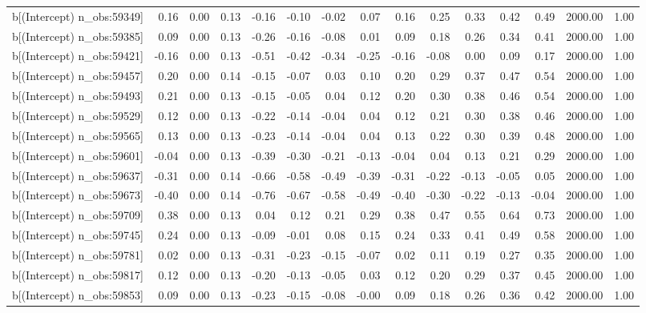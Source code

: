 \begin{table}[ht]
\begin{tabular}{rrrrrrrrrrrrrrr}
  b[(Intercept) n\_obs:59349] & 0.16 & 0.00 & 0.13 & -0.16 & -0.10 & -0.02 & 0.07 & 0.16 & 0.25 & 0.33 & 0.42 & 0.49 & 2000.00 & 1.00 \\ 
  b[(Intercept) n\_obs:59385] & 0.09 & 0.00 & 0.13 & -0.26 & -0.16 & -0.08 & 0.01 & 0.09 & 0.18 & 0.26 & 0.34 & 0.41 & 2000.00 & 1.00 \\ 
  b[(Intercept) n\_obs:59421] & -0.16 & 0.00 & 0.13 & -0.51 & -0.42 & -0.34 & -0.25 & -0.16 & -0.08 & 0.00 & 0.09 & 0.17 & 2000.00 & 1.00 \\ 
  b[(Intercept) n\_obs:59457] & 0.20 & 0.00 & 0.14 & -0.15 & -0.07 & 0.03 & 0.10 & 0.20 & 0.29 & 0.37 & 0.47 & 0.54 & 2000.00 & 1.00 \\ 
  b[(Intercept) n\_obs:59493] & 0.21 & 0.00 & 0.13 & -0.15 & -0.05 & 0.04 & 0.12 & 0.20 & 0.30 & 0.38 & 0.46 & 0.54 & 2000.00 & 1.00 \\ 
  b[(Intercept) n\_obs:59529] & 0.12 & 0.00 & 0.13 & -0.22 & -0.14 & -0.04 & 0.04 & 0.12 & 0.21 & 0.30 & 0.38 & 0.46 & 2000.00 & 1.00 \\ 
  b[(Intercept) n\_obs:59565] & 0.13 & 0.00 & 0.13 & -0.23 & -0.14 & -0.04 & 0.04 & 0.13 & 0.22 & 0.30 & 0.39 & 0.48 & 2000.00 & 1.00 \\ 
  b[(Intercept) n\_obs:59601] & -0.04 & 0.00 & 0.13 & -0.39 & -0.30 & -0.21 & -0.13 & -0.04 & 0.04 & 0.13 & 0.21 & 0.29 & 2000.00 & 1.00 \\ 
  b[(Intercept) n\_obs:59637] & -0.31 & 0.00 & 0.14 & -0.66 & -0.58 & -0.49 & -0.39 & -0.31 & -0.22 & -0.13 & -0.05 & 0.05 & 2000.00 & 1.00 \\ 
  b[(Intercept) n\_obs:59673] & -0.40 & 0.00 & 0.14 & -0.76 & -0.67 & -0.58 & -0.49 & -0.40 & -0.30 & -0.22 & -0.13 & -0.04 & 2000.00 & 1.00 \\ 
  b[(Intercept) n\_obs:59709] & 0.38 & 0.00 & 0.13 & 0.04 & 0.12 & 0.21 & 0.29 & 0.38 & 0.47 & 0.55 & 0.64 & 0.73 & 2000.00 & 1.00 \\ 
  b[(Intercept) n\_obs:59745] & 0.24 & 0.00 & 0.13 & -0.09 & -0.01 & 0.08 & 0.15 & 0.24 & 0.33 & 0.41 & 0.49 & 0.58 & 2000.00 & 1.00 \\ 
  b[(Intercept) n\_obs:59781] & 0.02 & 0.00 & 0.13 & -0.31 & -0.23 & -0.15 & -0.07 & 0.02 & 0.11 & 0.19 & 0.27 & 0.35 & 2000.00 & 1.00 \\ 
  b[(Intercept) n\_obs:59817] & 0.12 & 0.00 & 0.13 & -0.20 & -0.13 & -0.05 & 0.03 & 0.12 & 0.20 & 0.29 & 0.37 & 0.45 & 2000.00 & 1.00 \\ 
  b[(Intercept) n\_obs:59853] & 0.09 & 0.00 & 0.13 & -0.23 & -0.15 & -0.08 & -0.00 & 0.09 & 0.18 & 0.26 & 0.36 & 0.42 & 2000.00 & 1.00 \\ 

\end{tabular}
\end{table}
